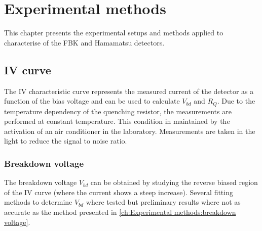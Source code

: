 \chapter{Experimental methods}
\label{ch:Experimental setup and methods}
This chapter presents the experimental setups and methods applied to characterise of the FBK and Hamamatsu detectors.

%
%
\section{IV curve}
\label{section:IV curve}
The IV characteristic curve represents the measured current of the detector as a function of the bias voltage and can be used to calculate $V_{bd}$ and $R_Q$. Due to the temperature dependency of the quenching resistor, the measurements are performed at constant temperature. This condition in maintained by the activation of an air conditioner in the laboratory. 
Measurements are taken in the light to reduce the signal to noise ratio. 
\subsection{Breakdown voltage} 
The breakdown voltage $V_{bd}$ can be obtained by studying the reverse biased region of the IV curve (where the current shows a steep increase). Several fitting methods to determine $V_{bd}$ where tested
but preliminary results where not as accurate as the method presented in \ref{ch:Experimental methods:breakdown voltage}. 

